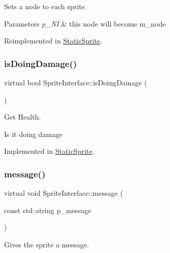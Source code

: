 Sets a node to each sprite. 


\begin{DoxyParams}{Parameters}
{\em p\+\_\+\+NI} & this node will become m\+\_\+node \\
\hline
\end{DoxyParams}


Reimplemented in \mbox{\hyperlink{class_static_sprite_a672bb6e3425bbc15cd9034ab9e2802fd}{Static\+Sprite}}.

\mbox{\label{class_sprite_interface_a91a747b887e19cfc6e5256d4afc2f64c}} 
\subsubsection{\texorpdfstring{is\+Doing\+Damage()}{isDoingDamage()}}
{\footnotesize\ttfamily virtual bool Sprite\+Interface\+::is\+Doing\+Damage (\begin{DoxyParamCaption}{ }\end{DoxyParamCaption})\hspace{0.3cm}{\ttfamily [pure virtual]}}



Get Health. 

Is it doing damage 

Implemented in \mbox{\hyperlink{class_static_sprite_a4b037abeff328dd42777875fd145aae3}{Static\+Sprite}}.

\mbox{\label{class_sprite_interface_ad5335c5370f97cd81a52769cb0a25559}} 
\subsubsection{\texorpdfstring{message()}{message()}}
{\footnotesize\ttfamily virtual void Sprite\+Interface\+::message (\begin{DoxyParamCaption}\item[{const std\+::string}]{p\+\_\+message }\end{DoxyParamCaption})\hspace{0.3cm}{\ttfamily [pure virtual]}}



Gives the sprite a message. 


